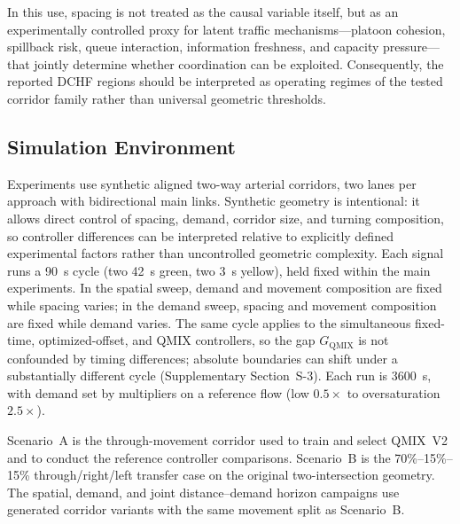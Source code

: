 \documentclass[review,12pt]{elsarticle}
\begin{document}
In this use, spacing is not treated as the causal variable itself, but as an experimentally controlled proxy for latent traffic mechanisms---platoon cohesion, spillback risk, queue interaction, information freshness, and capacity pressure---that jointly determine whether coordination can be exploited. Consequently, the reported DCHF regions should be interpreted as operating regimes of the tested corridor family rather than universal geometric thresholds.

\subsection{Simulation Environment}
\label{subsec:simulation_env}

Experiments use synthetic aligned two-way arterial corridors, two lanes per approach with bidirectional main links. Synthetic geometry is intentional: it allows direct control of spacing, demand, corridor size, and turning composition, so controller differences can be interpreted relative to explicitly defined experimental factors rather than uncontrolled geometric complexity. Each signal runs a 90~s cycle (two 42~s green, two 3~s yellow), held fixed within the main experiments. In the spatial sweep, demand and movement composition are fixed while spacing varies; in the demand sweep, spacing and movement composition are fixed while demand varies. The same cycle applies to the simultaneous fixed-time, optimized-offset, and QMIX controllers, so the gap $G_{\mathrm{QMIX}}$ is not confounded by timing differences; absolute boundaries can shift under a substantially different cycle (Supplementary Section~S-3). Each run is 3600~s, with demand set by multipliers on a reference flow (low $0.5\times$ to oversaturation $2.5\times$).

Scenario~A is the through-movement corridor used to train and select QMIX~V2 and to conduct the reference controller comparisons. Scenario~B is the 70\%--15\%--15\% through/right/left transfer case on the original two-intersection geometry. The spatial, demand, and joint distance--demand horizon campaigns use generated corridor variants with the same movement split as Scenario~B.
\end{document}
